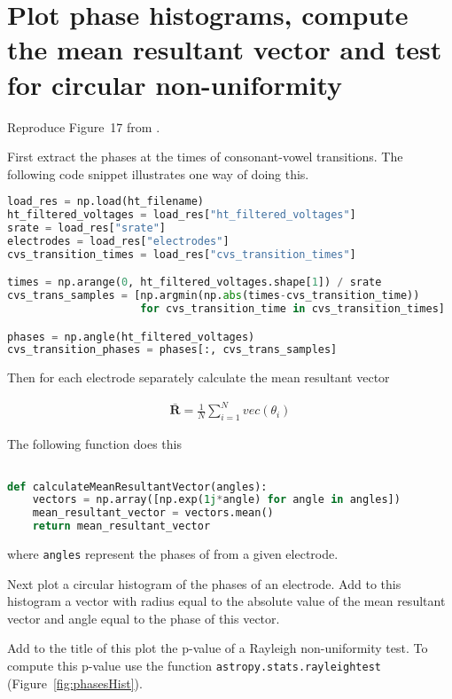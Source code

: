 \documentclass[12pt]{article}
\begin{document}
\section{Plot phase histograms, compute the mean resultant vector and test for circular non-uniformity}

Reproduce Figure~17 from \citet{rapelaInPrepSyncTWs}.

First extract the phases at the times of consonant-vowel transitions. The
following code snippet illustrates one way of doing this.

\begin{lstlisting}[language=python]
load_res = np.load(ht_filename)
ht_filtered_voltages = load_res["ht_filtered_voltages"]
srate = load_res["srate"]
electrodes = load_res["electrodes"]
cvs_transition_times = load_res["cvs_transition_times"]

times = np.arange(0, ht_filtered_voltages.shape[1]) / srate
cvs_trans_samples = [np.argmin(np.abs(times-cvs_transition_time))
                     for cvs_transition_time in cvs_transition_times]

phases = np.angle(ht_filtered_voltages)
cvs_transition_phases = phases[:, cvs_trans_samples]
\end{lstlisting}

Then for each electrode separately calculate the mean resultant vector

\begin{align}
    \bar{\mathbf{R}}=\frac{1}{N}\sum_{i=1}^Nvec(\theta_i)
\end{align}

The following function does this

\begin{lstlisting}[language=python]

def calculateMeanResultantVector(angles):
    vectors = np.array([np.exp(1j*angle) for angle in angles])
    mean_resultant_vector = vectors.mean()
    return mean_resultant_vector

\end{lstlisting}

\noindent where \texttt{angles} represent the phases of from a given electrode.

Next plot a circular histogram of the phases of an electrode. Add to this
histogram a vector with radius equal to the absolute value of the mean
resultant vector and angle equal to the phase of this vector.

Add to the title of this plot the p-value of a Rayleigh non-uniformity test. To compute this p-value use the function
\texttt{astropy.stats.rayleightest} (Figure~\ref{fig:phasesHist}).
\end{document}
